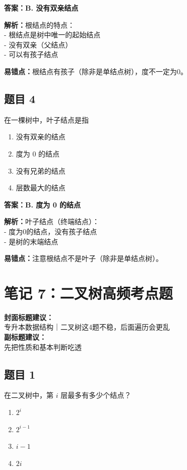 \documentclass[12pt,a4paper]{ctexart}
\begin{document}
\begin{answerbox}
	\textbf{答案：B. 没有双亲结点}

	\textbf{解析：}根结点的特点：\\
	- 根结点是树中唯一的起始结点\\
	- 没有双亲（父结点）\\
	- 可以有孩子结点

	\textbf{易错点：}根结点有孩子（除非是单结点树），度不一定为0。
\end{answerbox}

\subsection*{题目 4}
在一棵树中，叶子结点是指
\begin{enumerate}[label=\Alph*.]
	\item 没有双亲的结点
	\item 度为 0 的结点
	\item 没有兄弟的结点
	\item 层数最大的结点
\end{enumerate}

\begin{answerbox}
	\textbf{答案：B. 度为 0 的结点}

	\textbf{解析：}叶子结点（终端结点）：\\
	- 度为0的结点，没有孩子结点\\
	- 是树的末端结点

	\textbf{易错点：}注意根结点不是叶子（除非是单结点树）。
\end{answerbox}

\newpage

\section{笔记 7：二叉树高频考点题}
\begin{coverbox}
	\textbf{封面标题建议：}\\
	专升本数据结构｜二叉树这4题不稳，后面遍历会更乱\\
	\textbf{副标题建议：}\\
	先把性质和基本判断吃透
\end{coverbox}

\subsection*{题目 1}
在二叉树中，第 $i$ 层最多有多少个结点？
\begin{enumerate}[label=\Alph*.]
	\item $2^i$
	\item $2^{i-1}$
	\item $i-1$
	\item $2i$
\end{enumerate}
\end{document}
